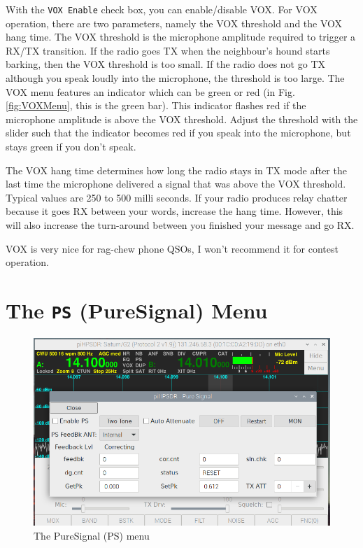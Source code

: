 \documentclass[12pt]{book}
\def\rett#1{\texttt{\color{red}#1}}
\begin{document}
With the \rett{VOX Enable} check box, you can enable/disable VOX. For VOX operation,
there are two parameters, namely the VOX threshold and the VOX hang time. The VOX threshold
is the microphone amplitude required to trigger a RX/TX transition. If the radio goes TX
when the neighbour's hound starts barking, then the VOX threshold is too small. If the radio
does not go TX  although you speak loudly into the microphone, the threshold is too large.
The VOX menu features an indicator which can be green or red (in Fig. \ref{fig:VOXMenu}, this
is the green bar). This indicator flashes red if the microphone amplitude is above the VOX
threshold. Adjust the threshold with the slider such that the indicator becomes red if  you
speak into the microphone, but stays green if you don't speak.

The VOX hang time determines how long the radio stays in TX mode after the last time the
microphone delivered a signal that was above the VOX threshold. Typical values are 250 to
500 milli seconds. If your radio produces relay chatter because it goes RX between your words,
increase the hang time. However, this will also increase the turn-around between you finished
your message and go RX.

VOX is very nice for rag-chew phone QSOs, I won't recommend it for contest operation.

\section{The \texttt{PS} (PureSignal) Menu}

\begin{figure}[ht]
\center
\includegraphics[width=12cm]{PSMenu.png}
\caption{The PureSignal (PS) menu}
\label{fig:PSMenu}
\end{figure}
\end{document}
